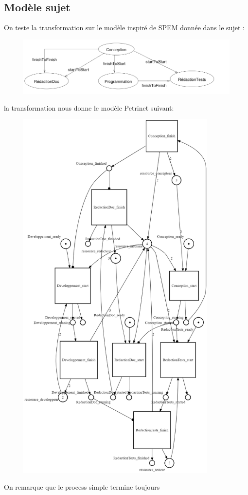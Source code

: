 \documentclass{article}
\begin{document}
\subsection{Modèle sujet}
On teste la transformation sur le modèle inspiré de SPEM donnée dans le sujet :
\begin{figure}[H]
    \centering
    \includegraphics[width = 15cm]{pdl-sujet.png}
\end{figure}
la transformation nous donne le modèle Petrinet suivant:
\begin{figure}[H]
    \centering
    \includegraphics[width = 10cm]{net-sujet.png}
\end{figure}
On remarque que le process simple termine toujours
\end{document}
